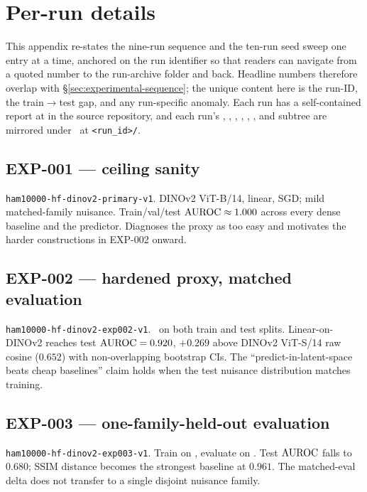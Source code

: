 \section{Per-run details}
\label{app:per-run}

This appendix re-states the nine-run sequence and the ten-run seed
sweep one entry at a time, anchored on the run identifier so that
readers can navigate from a quoted number to the run-archive folder and
back. Headline numbers therefore overlap with \S\ref{sec:experimental-sequence};
the unique content here is the run-ID, the train$\to$test gap, and any
run-specific anomaly. Each run has a self-contained report at
 in the source repository, and
each run's , , ,
, , ,
and  subtree are mirrored under \runarchive\ at
\texttt{<run\_id>/}.

\subsection{EXP-001 --- ceiling sanity}
\label{app:per-run:exp001}
\texttt{ham10000-hf-dinov2-primary-v1}. DINOv2 ViT-B/14, linear, SGD;
mild matched-family nuisance. Train/val/test $\mathrm{AUROC} \approx 1.000$ across
every dense baseline and the predictor. Diagnoses the proxy as too easy
and motivates the harder constructions in EXP-002 onward.

\subsection{EXP-002 --- hardened proxy, matched evaluation}
\label{app:per-run:exp002}
\texttt{ham10000-hf-dinov2-exp002-v1}. \strongfam\ on both train and test
splits. Linear-on-DINOv2 reaches test $\mathrm{AUROC} = 0.920$, $+0.269$ above
DINOv2 ViT-S/14 raw cosine ($0.652$) with non-overlapping bootstrap CIs.
The ``predict-in-latent-space beats cheap baselines'' claim holds when
the test nuisance distribution matches training.

\subsection{EXP-003 --- one-family-held-out evaluation}
\label{app:per-run:exp003}
\texttt{ham10000-hf-dinov2-exp003-v1}. Train on \strongfam, evaluate on
\strongholdone. Test $\mathrm{AUROC}$ falls to $0.680$; SSIM distance becomes the
strongest baseline at $0.961$. The matched-eval delta does not transfer to
a single disjoint nuisance family.

